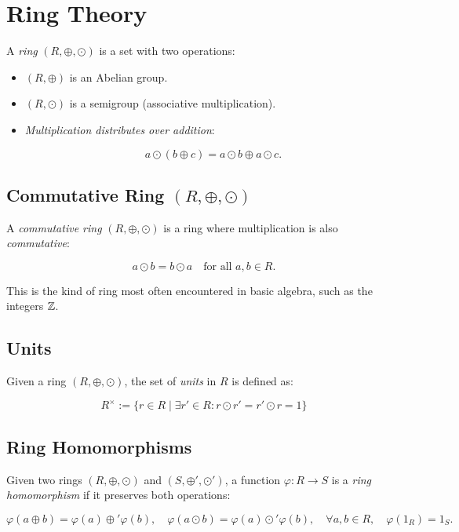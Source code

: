 \chapter{Ring Theory}

A \emph{ring} \((R, \oplus, \odot)\) is a set with two operations:

\begin{itemize}

	\item \((R, \oplus)\) is an Abelian group.

	\item \((R, \odot)\) is a semigroup (associative multiplication).

	\item \emph{Multiplication distributes over addition}:

	      \[
		      a \odot (b \oplus c) = a \odot b \oplus a \odot c.
	      \]
\end{itemize}

\section{Commutative Ring \texorpdfstring{\((R, \oplus, \odot)\)}{}}

A \emph{commutative ring} \((R, \oplus, \odot)\) is a ring where multiplication is also \emph{commutative}:

\[
	a \odot b = b \odot a \quad \text{for all } a, b \in R.
\]

This is the kind of ring most often encountered in basic algebra, such as the integers \(\mathbb{Z}\).

\section{Units}

Given a ring \((R, \oplus, \odot)\), the set of \emph{units} in \(R\) is defined as:

\[
	R^\times := \{r \in R \mid \exists r' \in R: r \odot r' = r' \odot r = 1\}
\]

\section{Ring Homomorphisms}

Given two rings \((R, \oplus, \odot)\) and \((S, \oplus', \odot')\), a function \(\varphi: R \to S\) is a \emph{ring homomorphism} if it preserves both operations:

\[
	\varphi(a \oplus b) = \varphi(a) \oplus' \varphi(b), \quad \varphi(a \odot b) = \varphi(a) \odot' \varphi(b), \quad \forall a, b \in R, \quad \varphi(1_R) = 1_S.
\]

